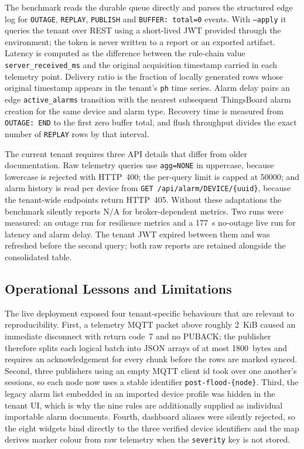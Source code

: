 \documentclass[conference]{IEEEtran}
\begin{document}
The benchmark reads the durable queue directly and parses the structured edge
log for \texttt{OUTAGE}, \texttt{REPLAY}, \texttt{PUBLISH} and
\texttt{BUFFER: total=0} events. With \texttt{--apply} it queries the tenant over
REST using a short-lived JWT provided through the environment; the token is
never written to a report or an exported artifact. Latency is computed as the
difference between the rule-chain value \texttt{server\_received\_ms} and the
original acquisition timestamp carried in each telemetry point. Delivery ratio
is the fraction of locally generated rows whose original timestamp appears in
the tenant's \texttt{ph} time series. Alarm delay pairs an edge
\texttt{active\_alarms} transition with the nearest subsequent ThingsBoard alarm
creation for the same device and alarm type. Recovery time is measured from
\texttt{OUTAGE: END} to the first zero buffer total, and flush throughput divides
the exact number of \texttt{REPLAY} rows by that interval.

The current tenant requires three API details that differ from older
documentation. Raw telemetry queries use \texttt{agg=NONE} in uppercase, because
lowercase is rejected with HTTP~400; the per-query limit is capped at 50000;
and alarm history is read per device from
\texttt{GET /api/alarm/DEVICE/\{uuid\}}, because the tenant-wide endpoints return
HTTP~405. Without these adaptations the benchmark silently reports N/A for
broker-dependent metrics. Two runs were measured: an outage run for resilience
metrics and a 177~s no-outage live run for latency and alarm delay. The tenant
JWT expired between them and was refreshed before the second query; both raw
reports are retained alongside the consolidated table.

\subsection{Operational Lessons and Limitations}

The live deployment exposed four tenant-specific behaviours that are relevant to
reproducibility. First, a telemetry MQTT packet above roughly 2~KiB caused an
immediate disconnect with return code~7 and no PUBACK; the publisher therefore
splits each logical batch into JSON arrays of at most 1800~bytes and requires an
acknowledgement for every chunk before the rows are marked synced. Second, three
publishers using an empty MQTT client id took over one another's sessions, so
each node now uses a stable identifier \texttt{post-flood-\{node\}}. Third, the
legacy alarm list embedded in an imported device profile was hidden in the
tenant UI, which is why the nine rules are additionally supplied as individual
importable alarm documents. Fourth, dashboard aliases were silently rejected,
so the eight widgets bind directly to the three verified device identifiers and
the map derives marker colour from raw telemetry when the \texttt{severity} key
is not stored.
\end{document}
